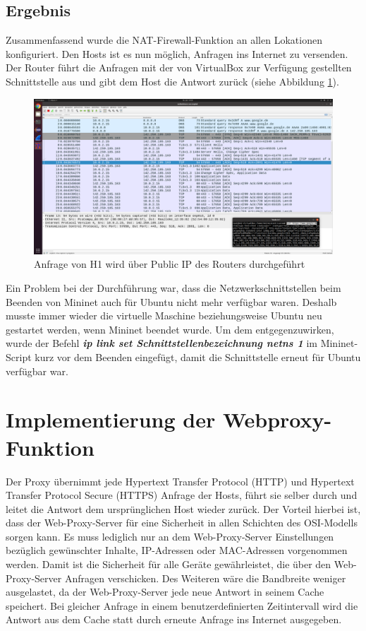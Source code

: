 \documentclass[fontsize=12pt,paper=a4,open=any,parskip=half,
  twoside=false,toc=listof,toc=bibliography,fleqn,leqno,
  captions=nooneline,captions=tableabove,british]{scrbook}
\begin{document}
\subsection{Ergebnis}
Zusammenfassend wurde die NAT-Firewall-Funktion an allen Lokationen konfiguriert. Den Hosts ist es nun möglich, Anfragen ins Internet zu versenden. Der Router führt die Anfragen mit der von VirtualBox zur Verfügung gestellten Schnittstelle aus und gibt dem Host die Antwort zurück (siehe Abbildung \ref{nat}).

\begin{figure}[H]
 \centering
 \includegraphics[width=1.0\textwidth]{Bilder/nat}
 \captionsetup{justification=centering,margin=2cm}
 \caption{Anfrage von H1 wird über Public IP des Routers durchgeführt}
 \label{nat}
\end{figure}

Ein Problem bei der Durchführung war, dass die Netzwerkschnittstellen beim Beenden von Mininet auch für Ubuntu nicht mehr verfügbar waren. Deshalb musste immer wieder die virtuelle Maschine beziehungsweise Ubuntu neu gestartet werden, wenn Mininet beendet wurde. Um dem entgegenzuwirken, wurde der Befehl \textit{\textbf{ip link set Schnittstellenbezeichnung netns 1}} im Mininet-Script kurz vor dem Beenden eingefügt, damit die Schnittstelle erneut für Ubuntu verfügbar war.

\section{Implementierung der Webproxy-Funktion}
Der Proxy übernimmt jede Hypertext Transfer Protocol (HTTP) und Hypertext Transfer Protocol Secure (HTTPS) Anfrage der Hosts, führt sie selber durch und leitet die Antwort dem ursprünglichen Host wieder zurück. Der Vorteil hierbei ist, dass der Web-Proxy-Server für eine Sicherheit in allen Schichten des OSI-Modells sorgen kann. Es muss lediglich nur an dem Web-Proxy-Server Einstellungen bezüglich gewünschter Inhalte, IP-Adressen oder MAC-Adressen vorgenommen werden. Damit ist die Sicherheit für alle Geräte gewährleistet, die über den Web-Proxy-Server Anfragen verschicken. Des Weiteren wäre die Bandbreite weniger ausgelastet, da der Web-Proxy-Server jede neue Antwort in seinem Cache speichert. Bei gleicher Anfrage in einem benutzerdefinierten Zeitintervall wird die Antwort aus dem Cache statt durch erneute Anfrage ins Internet ausgegeben.
\end{document}
